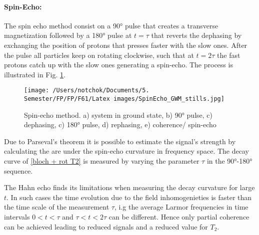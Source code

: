 \paragraph{Spin-Echo:}
The spin echo method consist on a 90° pulse that creates a transverse magnetization followed by a 180° pulse at $t = \tau$ that reverts the dephasing  by exchanging the position of protons that presses faster with the slow ones.  After the pulse all particles keep on rotating clockwise, such that at $t = 2\tau$ the fast protons catch up with the slow ones generating a spin-echo. The process is illustrated in Fig. \ref{fig: spin-echo}. 
\begin{figure}[!htbp]
 \begin{center}
  \texttt{[image: /Users/notchok/Documents/5. Semester/FP/FP/F61/Latex images/SpinEcho\_GWM\_stills.jpg]}
  \caption[]{Spin-echo method. a) system in ground state, b) 90° pulse, c) dephasing, c) 180° pulse, d) rephasing, e) coherence/ spin-echo  \footnotemark}
    \label{fig: spin-echo}
 \end{center}
\end{figure}
Due to Parseval's theorem it is possible to estimate the signal's strength by calculating the are under the spin-echo curvature in frequency space.
The decay curve of \ref{bloch + rot T2} is measured by varying the parameter $\tau$ in the 90°-180° sequence.

The Hahn echo finds its limitations when measuring the decay curvature for large $t$. In such cases the time evolution due to the field inhomogenieties is faster than the time scale of the measurement $\tau$, i.g the average Larmor frequencies in time intervals $0 < t < \tau$ and $\tau < t < 2 \tau$ can be different. Hence only partial coherence can be achieved leading to reduced signals and a reduced value for $T_2$.

